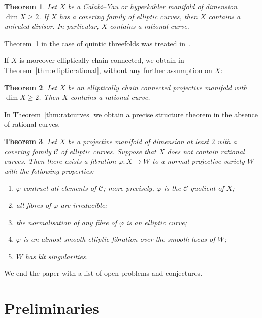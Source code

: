 \documentclass[11pt]{article}
\newtheorem{theo}{Theorem}[section]
\theoremstyle{definition}
\numberwithin{equation}{section}
\numberwithin{figure}{section}
\numberwithin{table}{section}
\newcommand\sC{\mathcal{C}}
\newcommand*{\romanenumi}{\renewcommand*{\theenumi}{\roman{enumi}}}
\begin{document}
\begin{theo}\label{thm:D}
Let $X$ be a Calabi--Yau or hyperkähler manifold of dimension $\dim X \geq 2$. If $X$ has a covering family of elliptic curves, then $X$ contains a uniruled divisor. In particular, $X$ contains a rational curve.
\end{theo}

Theorem~\ref{thm:D} in the case of quintic threefolds was treated in~\cite[Lecture 22]{CKL88}.

If $X$ is moreover elliptically chain connected, we obtain in Theorem~\ref{thm:ellipticrational}, without any further assumption on $X$:

\begin{theo}\label{thm:main1.5}
Let $X$ be an elliptically chain connected projective manifold with $\dim X \geq 2$. Then $X$ contains a rational curve.
\end{theo}

In Theorem~\ref{thm:ratcurves} we obtain a precise structure theorem in the absence of rational curves.

\pagebreak
\begin{theo}\label{thm:main1.6}
Let $X$ be a projective manifold of dimension at least $2$ with a covering family $\sC$ of elliptic curves. Suppose that $X$ does not contain rational curves. Then there exists a fibration $\varphi\colon X \to W$ to a normal projective variety $W$ with the following properties:
\begin{enumerate}\romanenumi
\item \label{list-1.6.1}$\varphi$ contract all elements of $\sC$; more precisely, $\varphi$ is the $\sC$-quotient of $X$;
\item \label{list-1.6.2}all fibres of $\varphi$ are irreducible;
\item \label{list-1.6.3}the normalisation of any fibre of $\varphi$ is an elliptic curve;
\item \label{list-1.6.4}$\varphi$ is an almost smooth elliptic fibration over the smooth locus of $W$;
\item \label{list-1.6.5}$W$ has klt singularities.
\end{enumerate}
\end{theo}

We end the paper with a list of open problems and conjectures.


\section{Preliminaries} \label{sec:prelim}
\end{document}
